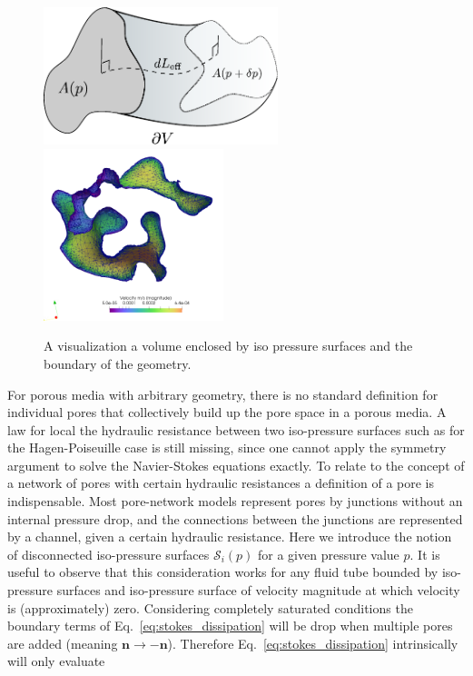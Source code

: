 \documentclass[draft]{agujournal2019}
\begin{document}
\begin{centering}
\begin{figure}[t!]\label{fig:isop_surfaces}
\includegraphics[height=4cm]{figures/isopressure_surfaces.pdf}~~~~
\includegraphics[height=5cm]{figures/iso_segmentation_example.png}
\caption{A visualization a volume enclosed by iso pressure surfaces and the boundary of the geometry.}
\end{figure}
\end{centering}
For porous media with arbitrary geometry, there is no standard definition for individual pores that collectively build up the pore space in a porous media. A law for local the hydraulic resistance between two iso-pressure surfaces such as for the Hagen-Poiseuille case is still missing, since one cannot apply the symmetry argument to solve the Navier-Stokes equations exactly. To relate to the concept of a network of pores with certain hydraulic resistances a definition of a pore is indispensable. Most pore-network models represent pores by junctions without an internal pressure drop, and the connections between the junctions are represented by a channel, given a certain hydraulic resistance. Here we introduce the notion of disconnected iso-pressure surfaces $\mathcal{S}_i(p)$ for a given pressure value $p$.
It is useful to observe that this consideration works for any fluid tube bounded by iso-pressure surfaces and iso-pressure surface of velocity magnitude at which velocity is (approximately) zero. Considering completely saturated conditions the boundary terms of Eq.~\ref{eq:stokes_dissipation} will be drop when multiple pores are added (meaning $\mathbf{n}\rightarrow -\mathbf{n}$). Therefore Eq.~\ref{eq:stokes_dissipation} intrinsically will only evaluate
\end{document}
